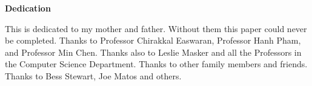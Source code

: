\begin{center}
	
\textbf{\Large Dedication}
\end{center}

This is dedicated to my mother and father. Without them this paper could never be completed. Thanks to Professor Chirakkal Easwaran, Professor Hanh Pham, and Professor Min Chen. Thanks also to Leslie Masker and all the Professors in the Computer Science Department. Thanks to other family members and friends. Thanks to Bess Stewart, Joe Matos and others. 